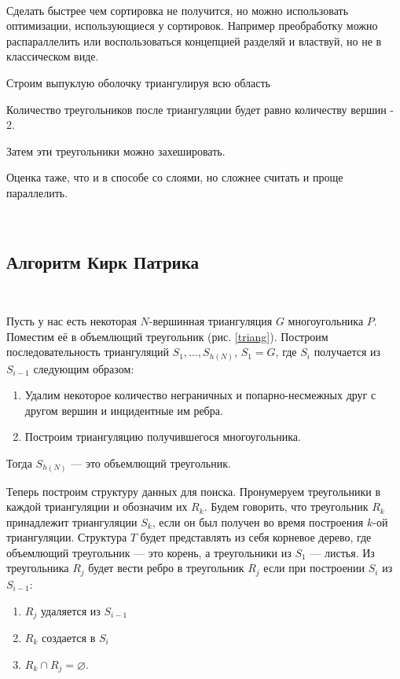 \

Сделать быстрее чем сортировка не получится, но можно использовать оптимизации, использующиеся у сортировок. Например преобработку можно распараллелить или воспользоваться концепцией разделяй и властвуй, но не в классическом виде.

Строим выпуклую оболочку триангулируя всю область

Количество треугольников после триангуляции будет равно количеству вершин - 2.

Затем эти треугольники можно захешировать.

Оценка таже, что и в способе со слоями, но сложнее считать и проще параллелить.

\

\subsection{Алгоритм Кирк Патрика}

\

Пусть у нас есть некоторая $N$-вершинная триангуляция $G$ многоугольника $P$. Поместим её в объемлющий треугольник (рис. \ref{triang}).
Построим последовательность триангуляций $S_1, ..., S_{h(N)}$, $S_1 = G$, где $S_i$ получается из $S_{i - 1}$ следующим образом:
\begin{enumerate}
    \item Удалим некоторое количество неграничных и попарно-несмежных друг с другом вершин и инцидентные им ребра.
    \item Построим триангуляцию получившегося многоугольника.
\end{enumerate}
Тогда $S_{h(N)}$ --- это объемлющий треугольник.

Теперь построим структуру данных для поиска. Пронумеруем треугольники в каждой триангуляции и обозначим их $R_k$.
Будем говорить, что треугольник $R_k$ принадлежит триангуляции $S_k$, если он был получен во время построения $k$-ой триангуляции.
Структура $T$ будет представлять из себя корневое дерево, где объемлющий треугольник --- это корень, а треугольники из $S_1$ --- листья.
Из треугольника $R_j$ будет вести ребро в треугольник $R_j$ если при построении $S_i$ из $S_{i - 1}$:
\begin{enumerate}
    \item $R_j$ удаляется из $S_{i - 1}$
    \item $R_k$ создается в $S_i$
    \item $R_k \cap R_j = \varnothing$.
\end{enumerate}

